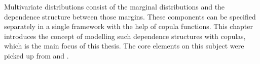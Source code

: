 
Multivariate distributions consist of the marginal distributions and the dependence structure between those margins. These components can be specified separately in a single framework with the help of copula functions. This chapter introduces the concept of modelling such dependence structures with copulas, which is the main focus of this thesis. The core elements on this subject were picked up from \cite{mcneil2015quantitative} and \cite{Ruppert2015}.